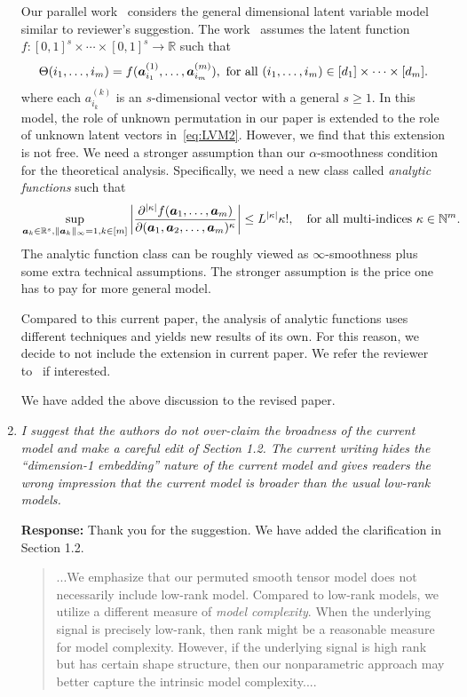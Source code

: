 \documentclass[11pt]{article}
\theoremstyle{plain}
\theoremstyle{definition}
\begin{document}
\begin{enumerate}[wide, labelwidth=!, labelindent=0pt]
Our parallel work~\citep{lee2023statistical} considers the general dimensional latent variable model similar to reviewer's suggestion. 
  The work~\citep{lee2023statistical} assumes the latent function $f\colon[0,1]^{s}\times\cdots\times[0,1]^{s}\rightarrow \mathbb{R}$ such that
    \begin{align}\label{eq:LVM2}
    \Theta(i_1,\ldots,i_m) = f(\bm{a}^{(1)}_{i_1},\ldots,\bm{a}^{(m)}_{i_m}), \text{ for all } (i_1,\ldots,i_m)\in[d_1]\times\cdots\times [d_m].
\end{align}
where each $a^{(k)}_{i_k}$ is an $s$-dimensional vector with a general $s\geq 1$. In this model, the role of unknown permutation in our paper is extended to the role of unknown latent vectors in~\eqref{eq:LVM2}. However, we find that this extension is not free. We need a stronger assumption than our $\alpha$-smoothness condition for the theoretical analysis. Specifically, we need a new class called \emph{analytic functions} such that
    \begin{align}\label{eq:analytic}
    \sup_{\bm{a}_k\in\mathbb{R}^s, \|\bm{a}_k\|_{\infty}=1, k\in[m]}\left|{\partial^{|\kappa|} f(\bm{a}_1,\ldots,\bm{a}_m)\over \partial(\bm{a}_1,\bm{a}_2,\ldots,\bm{a}_m)^{\kappa}}\right|\leq L^{|\kappa|}\kappa!,\quad \text{for all multi-indices } \kappa\in\mathbb{N}^m. 
\end{align}
The analytic function class can be roughly viewed as $\infty$-smoothness plus some extra technical assumptions. The stronger assumption is the price one has to pay for more general model. 

Compared to this current paper, the analysis of analytic functions uses different techniques and yields new results of its own.  For this reason, we decide to not include the extension in current paper. We refer the reviewer to~\citep{lee2023statistical} if interested. 

We have added the above discussion to the revised paper. 
    
    
    \item \textit{
    I suggest that the authors do not over-claim the broadness of the current model and make a careful edit of Section 1.2. The current writing hides the “dimension-1 embedding” nature of the current model and gives readers the wrong impression that the current model is broader than the usual low-rank models.
    }
    
    \textbf{Response:} Thank you for the suggestion. We have added the clarification in Section 1.2. 
    
   \begin{quote}
   {\color{blue}...We emphasize that our permuted smooth tensor model does not necessarily include low-rank model. Compared to low-rank models, we utilize a different measure of \emph{model complexity}.
When the underlying signal is precisely low-rank, then rank might be a reasonable measure for model complexity. However, if the underlying signal is high rank but has certain shape structure, then our nonparametric approach may better capture the intrinsic model complexity.... }
  \end{quote}
    

\end{enumerate}
\end{document}
